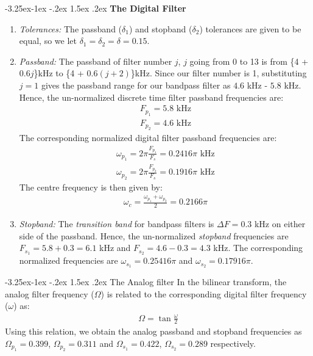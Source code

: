 \documentclass[article]{IEEEtran}
\makeatletter
\theoremstyle{remark}
\numberwithin{equation}{subsection}
\renewcommand\subsection{\@startsection{subsection}{2}{\z@}%
    {-3.25ex\@plus -1ex \@minus -.2ex}%
    {1.5ex \@plus .2ex}%
    {\normalfont\large\bfseries}}
\makeatother
\begin{document}
\subsection{\textbf{The Digital Filter}}
\begin{enumerate}[label = \roman*)]
    \item \textit{Tolerances:} The passband ($\delta_1$) and stopband ($\delta_2$) tolerances are given to be equal, so we let $\delta_1 = \delta_2 = \delta = 0.15$.
    
    \item \textit{Passband:} The passband of filter number $j$, $j$ going from 0 to 13 is from \{4 + 0.6$j$\}kHz to \{4 + 0.6$(j + 2)$\}kHz. Since our filter number is 1, substituting $j = 1$ gives the passband range for our bandpass filter as $4.6$ kHz - $5.8$ kHz. Hence, the un-normalized discrete time filter passband frequencies are:
    \begin{align}
        F_{p_1} = 5.8 \text{ kHz}\\
        F_{p_2} = 4.6 \text{ kHz}
    \end{align} The corresponding normalized digital filter passband frequencies are:
    \begin{align}
        \omega_{p_1} = 2\pi\frac{F_{p_1}}{F_s}  = 0.2416\pi\text{ kHz}\\
        \omega_{p_2} = 2\pi\frac{F_{p_2}}{F_s}  = 0.1916 \pi \text{ kHz}
    \end{align} The centre frequency is then given by:
    \begin{align}
        \omega_c = \frac{\omega_{p_1} + \omega_{p_2}}{2} = 0.2166\pi
    \end{align}  
    
    \item \textit{Stopband:} The \textit{transition band} for bandpass filters is $\Delta F = 0.3$ kHz on either side of the passband. Hence, the un-normalized \textit{stopband} frequencies are $F_{s_1} = 5.8 + 0.3 = 6.1$ kHz and $F_{s_2} = 4.6 - 0.3 = 4.3$ kHz. The corresponding normalized frequencies are $\omega_{s_1} = 0.25416 \pi$ and $\omega_{s_2} = 0.17916 \pi$.
\end{enumerate}
\subsection{The Analog filter}
In the bilinear transform, the analog filter frequency ($\Omega$) is related to the corresponding digital filter frequency ($\omega$) as:
\begin{align}
    \Omega = \tan \frac{\omega}{2}
\end{align} Using this relation, we obtain the analog passband and stopband frequencies as $\Omega_{p_1} = 0.399$, $\Omega_{p_2} = 0.311$ and $\Omega_{s_1} = 0.422$, $\Omega_{s_2} = 0.289$
respectively.
\end{document}
